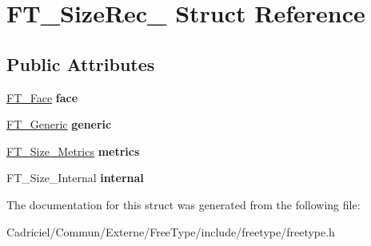 \hypertarget{struct_f_t___size_rec__}{}\section{F\+T\+\_\+\+Size\+Rec\+\_\+ Struct Reference}
\label{struct_f_t___size_rec__}
\subsection*{Public Attributes}
\begin{DoxyCompactItemize}
\item 
\hyperlink{struct_f_t___face_rec__}{F\+T\+\_\+\+Face} {\bfseries face}\hypertarget{struct_f_t___size_rec___a21b54fb07feaba8be23321054da98f5f}{}\label{struct_f_t___size_rec___a21b54fb07feaba8be23321054da98f5f}

\item 
\hyperlink{struct_f_t___generic__}{F\+T\+\_\+\+Generic} {\bfseries generic}\hypertarget{struct_f_t___size_rec___aa24520b093a9b4ba9ff388bfe7b9491d}{}\label{struct_f_t___size_rec___aa24520b093a9b4ba9ff388bfe7b9491d}

\item 
\hyperlink{struct_f_t___size___metrics__}{F\+T\+\_\+\+Size\+\_\+\+Metrics} {\bfseries metrics}\hypertarget{struct_f_t___size_rec___a29a6b518d09f6cf1714d9aed01eddc01}{}\label{struct_f_t___size_rec___a29a6b518d09f6cf1714d9aed01eddc01}

\item 
F\+T\+\_\+\+Size\+\_\+\+Internal {\bfseries internal}\hypertarget{struct_f_t___size_rec___a236c47ea3138e485c29b0d7baa5cf3b6}{}\label{struct_f_t___size_rec___a236c47ea3138e485c29b0d7baa5cf3b6}

\end{DoxyCompactItemize}


The documentation for this struct was generated from the following file\+:\begin{DoxyCompactItemize}
\item 
Cadriciel/\+Commun/\+Externe/\+Free\+Type/include/freetype/freetype.\+h\end{DoxyCompactItemize}
